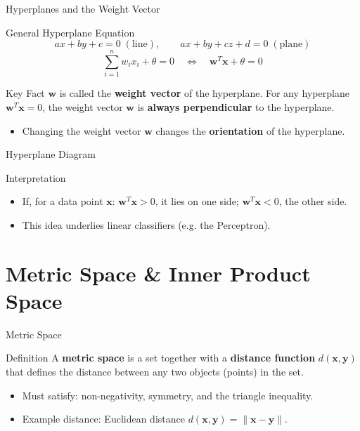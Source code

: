 \documentclass[9pt,aspectratio=169]{beamer}
\newcommand{\vect}[1]{\mathbf{#1}}
\begin{document}
\begin{frame}{Hyperplanes and the Weight Vector}
\begin{block}{General Hyperplane Equation}
$$ax+by+c=0 \;(\text{line}), \qquad ax+by+cz+d=0\;(\text{plane})$$
$$\sum_{i=1}^{n} w_ix_i + \theta = 0 \quad \Longleftrightarrow \quad \vect{w}^T\vect{x}+\theta = 0$$
\end{block}
\begin{alertblock}{Key Fact}
$\vect{w}$ is called the \textbf{weight vector} of the hyperplane. For any hyperplane $\vect{w}^T\vect{x}=0$, the weight vector $\vect{w}$ is \textbf{always perpendicular} to the hyperplane.
\end{alertblock}
\begin{itemize}
\item Changing the weight vector $\vect{w}$ changes the \textbf{orientation} of the hyperplane.
\end{itemize}
\end{frame}

\begin{frame}{Hyperplane Diagram}
\centering
{}
\begin{block}{Interpretation}
\begin{itemize}
\item If, for a data point $\vect{x}$: $\vect{w}^T\vect{x} > 0$, it lies on one side; $\vect{w}^T\vect{x} < 0$, the other side.
\item This idea underlies linear classifiers (e.g. the Perceptron).
\end{itemize}
\end{block}
\end{frame}

\section{Metric Space \& Inner Product Space}

\begin{frame}{Metric Space}
\begin{block}{Definition}
A \textbf{metric space} is a set together with a \textbf{distance function} $d(\vect{x},\vect{y})$ that defines the distance between any two objects (points) in the set.
\end{block}
\begin{itemize}
\item Must satisfy: non-negativity, symmetry, and the triangle inequality.
\item Example distance: Euclidean distance $d(\vect{x},\vect{y}) = \|\vect{x}-\vect{y}\|$.
\end{itemize}
\end{frame}
\end{document}
